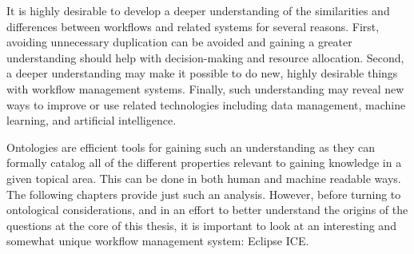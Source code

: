 It is highly desirable to develop a deeper understanding of the similarities and
differences between workflows and related systems for several reasons. First,
avoiding unnecessary duplication can be avoided and gaining a greater
understanding should help with decision-making and resource allocation. Second,
a deeper understanding may make it possible to do new, highly desirable things
with workflow management systems. Finally, such understanding may reveal new
ways to improve or use related technologies including data management, machine learning, and
artificial intelligence.

Ontologies are efficient tools for gaining such an understanding as they
can formally catalog all of the different properties relevant to gaining
knowledge in a given topical area. This can be done in both human and machine
readable ways. The following chapters provide just such an analysis. However,
before turning to ontological considerations, and in an effort to better
understand the origins of the questions at the core of this thesis, it is
important to look at an interesting and somewhat unique workflow management
system: Eclipse ICE.


